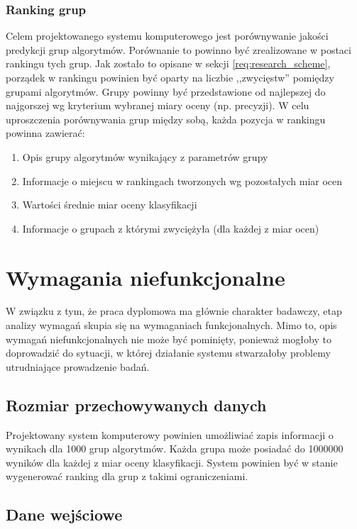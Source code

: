 \documentclass[../thesis.tex]{subfiles}
\begin{document}
\subsubsection{Ranking grup}

Celem projektowanego systemu komputerowego jest porównywanie jakości predykcji grup algorytmów. Porównanie to powinno być zrealizowane w postaci rankingu tych grup. Jak zostało to opisane w sekcji  \ref{req:research_scheme}, porządek w rankingu powinien być oparty na liczbie ,,zwycięstw'' pomiędzy grupami algorytmów. Grupy powinny być przedstawione od najlepszej do najgorszej wg kryterium wybranej miary oceny (np. precyzji). W celu uproszczenia porównywania grup między sobą, każda pozycja w rankingu powinna zawierać:
\begin{enumerate}
  \item Opis grupy algorytmów wynikający z parametrów grupy
  \item Informacje o miejscu w rankingach tworzonych wg pozostałych miar ocen
  \item Wartości średnie miar oceny klasyfikacji
  \item Informacje o grupach z którymi zwyciężyła (dla każdej z miar ocen)
\end{enumerate}

\section{Wymagania niefunkcjonalne}

W związku z tym, że praca dyplomowa ma głównie charakter badawczy, etap analizy wymagań skupia się na wymaganiach funkcjonalnych. Mimo to, opis wymagań niefunkcjonalnych nie może być pominięty, ponieważ mogłoby to doprowadzić do sytuacji, w której działanie systemu stwarzałoby problemy utrudniające prowadzenie badań.

\subsection{Rozmiar przechowywanych danych}

Projektowany system komputerowy powinien umożliwiać zapis informacji o wynikach dla 1000 grup algorytmów. Każda grupa może posiadać do 1000000 wyników dla każdej z miar oceny klasyfikacji. System powinien być w stanie wygenerować ranking dla grup z takimi ograniczeniami.

\subsection{Dane wejściowe}
\end{document}
